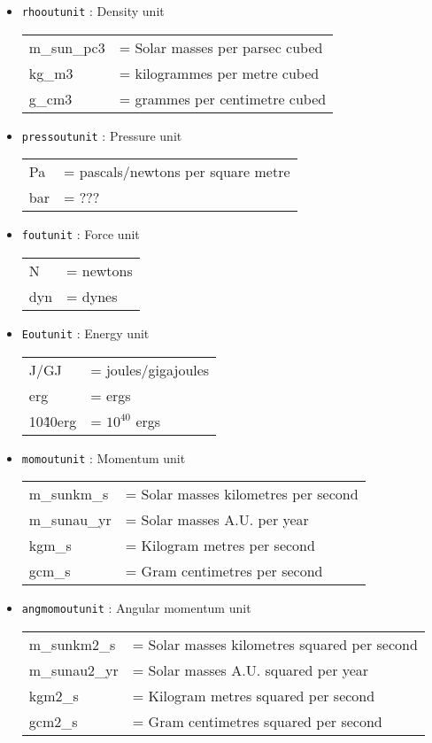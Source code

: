 \documentclass[a4paper]{article}
\newcommand{\var}[1]{\texttt{#1}}
\begin{document}
\begin{itemize}
\item \var{rhooutunit} : Density unit \\
\begin{tabular}{ll}
m\_sun\_pc3 & = Solar masses per parsec cubed \\
kg\_m3      & = kilogrammes per metre cubed \\
g\_cm3      & = grammes per centimetre cubed
\end{tabular}


\item \var{pressoutunit} : Pressure unit \\
\begin{tabular}{ll}
Pa    & = pascals/newtons per square metre \\
bar   & = ???
\end{tabular}

\item \var{foutunit} : Force unit \\
\begin{tabular}{ll}
N    & = newtons \\
dyn  & = dynes
\end{tabular}

\item \var{Eoutunit} : Energy unit \\
\begin{tabular}{ll}
J/GJ      & = joules/gigajoules \\
erg       & = ergs \\
10\^40erg & = $10^{40}$ ergs
\end{tabular}

\item \var{momoutunit} : Momentum unit \\
\begin{tabular}{ll}
m\_sunkm\_s  & = Solar masses kilometres per second \\
m\_sunau\_yr & = Solar masses A.U. per year \\
kgm\_s       & = Kilogram metres per second \\
gcm\_s       & = Gram centimetres per second
\end{tabular}

\item \var{angmomoutunit} : Angular momentum unit \\
\begin{tabular}{ll}
m\_sunkm2\_s  & = Solar masses kilometres squared per second \\
m\_sunau2\_yr & = Solar masses A.U. squared per year \\
kgm2\_s       & = Kilogram metres squared per second \\
gcm2\_s       & = Gram centimetres squared per second
\end{tabular}


\end{itemize}
\end{document}
